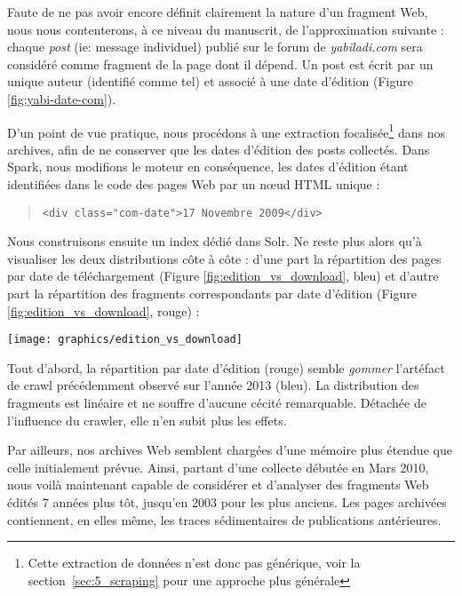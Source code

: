 \documentclass[symmetric,justified,marginals=raggedouter]{tufte-book}
\begin{document}
Faute de ne pas avoir encore définit clairement la nature d'un fragment Web, nous nous contenterons, à ce niveau du manuscrit, de l'approximation suivante : chaque \textit{post} (ie: message individuel) publié sur le forum de \textit{yabiladi.com} sera considéré comme fragment de la page dont il dépend. Un post est écrit par un unique auteur (identifié comme tel) et associé à une date d'édition (Figure \ref{fig:yabi-date-com}). 

D'un point de vue pratique, nous procédons à une extraction focalisée\footnote{Cette extraction de données n'est donc pas générique, voir la section~\ref{sec:5_scraping} pour une approche plus générale} dans nos archives, afin de ne conserver que les dates d'édition des posts collectés. Dans Spark, nous modifions le moteur en conséquence, les dates d'édition étant identifiées dans le code des pages Web par un nœud HTML unique : 
\begin{quote}
\small
\begin{verbatim}
<div class="com-date">17 Novembre 2009</div>
\end{verbatim}
\end{quote}
Nous construisons ensuite un index dédié dans Solr. Ne reste plus alors qu'à visualiser les deux distributions côte à côte : d'une part la répartition des pages par date de téléchargement (Figure \ref{fig:edition_vs_download}, bleu) et d'autre part la répartition des fragments correspondants par date d'édition (Figure \ref{fig:edition_vs_download}, rouge) :

\begin{figure*}%
  \texttt{[image: graphics/edition\_vs\_download]}
  \caption{Distribution, pour \textit{yabiladi.com}, du nombre de pages et de fragments archivés par jours et suivant leurs dates de téléchargement (bleu) et d'édition (rouge) respectives}
  \label{fig:edition_vs_download}
\end{figure*}

\noindent Tout d'abord, la répartition par date d'édition (rouge) semble \textit{gommer} l'artéfact de crawl précédemment observé sur l'année 2013 (bleu). La distribution des fragments est linéaire et ne souffre d'aucune cécité remarquable. Détachée de l'influence du crawler, elle n'en subit plus les effets. 

Par ailleurs, nos archives Web semblent chargées d'une mémoire plus étendue que celle initialement prévue. Ainsi, partant d'une collecte débutée en Mars 2010, nous voilà maintenant capable de considérer et d'analyser des fragments Web édités 7 années plus tôt, jusqu'en 2003 pour les plus anciens. Les pages archivées contiennent, en elles même, les traces sédimentaires de publications antérieures.
\end{document}

